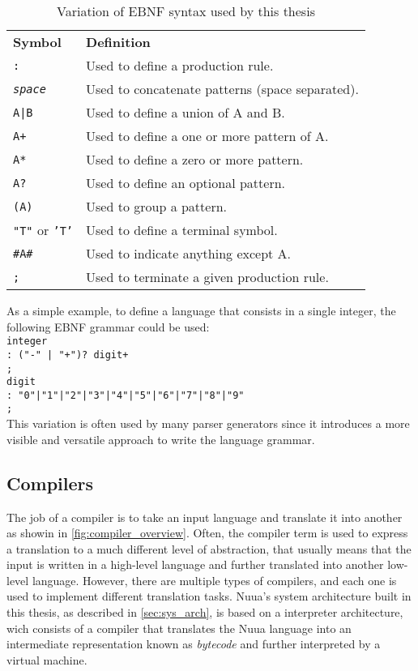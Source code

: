 \begin{table}[H]
    \centering
    \begin{tabular}{ l p{10cm} }
        \textbf{Symbol} & \textbf{Definition} \\
        \texttt{:} & Used to define a production rule. \\
        \texttt{\textit{space}} & Used to concatenate patterns (space separated). \\
        \texttt{A|B} & Used to define a union of A and B. \\
        \texttt{A+} & Used to define a one or more pattern of A. \\
        \texttt{A*} & Used to define a zero or more pattern. \\
        \texttt{A?} & Used to define an optional pattern. \\
        \texttt{(A)} & Used to group a pattern. \\
        \texttt{"T"} or \texttt{'T'} & Used to define a terminal symbol. \\
        \texttt{\#A\#} & Used to indicate anything except A. \\
        \texttt{;} & Used to terminate a given production rule. \\
    \end{tabular}
    \caption{Variation of EBNF syntax used by this thesis}
    \label{fig:ebnf_syntax}
\end{table}

As a simple example, to define a language that consists in a single integer, the following EBNF grammar could be used:\\

\texttt{integer\\\tab: ("-" | "+")? digit+\\\tab;}\\
\texttt{digit\\\tab: "0"|"1"|"2"|"3"|"4"|"5"|"6"|"7"|"8"|"9"\\\tab;}\\

This variation is often used by many parser generators since it introduces a more visible and versatile approach to
write the language grammar.

\subsection{Compilers}

The job of a compiler is to take an input language and translate it into another as showin in \autoref{fig:compiler_overview}.
Often, the compiler term is used to express a translation to a much different level of abstraction, that usually means
that the input is written in a high-level language and further translated into another low-level language.
However, there are multiple types of compilers, and each one is used to implement different translation tasks.
Nuua's system architecture built in this thesis, as described in \autoref{sec:sys_arch}, is based on a interpreter architecture, wich consists of a
compiler that translates the Nuua language into an intermediate representation known as \emph{bytecode} and further interpreted by a virtual machine.

